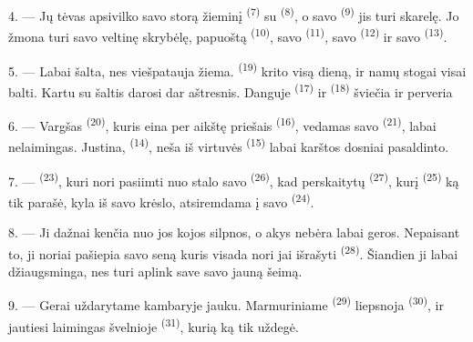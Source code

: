 4. --- Jų tėvas apsivilko savo storą žieminį  \textsuperscript{(7)} su
 \textsuperscript{(8)}, o savo 
\textsuperscript{(9)} jis turi skarelę. Jo žmona turi savo veltinę skrybėlę,
papuoštą  \textsuperscript{(10)}, savo 
\textsuperscript{(11)}, savo  \textsuperscript{(12)} ir savo
 \textsuperscript{(13)}.

5. --- Labai šalta, nes viešpatauja žiema.  \textsuperscript{(19)}
krito visą dieną, ir namų stogai visai balti. Kartu su  šaltis
darosi dar aštresnis. Danguje  \textsuperscript{(17)} ir
 \textsuperscript{(18)} šviečia ir perveria 

\VUsaut{4.2mm}
\VUsaut{3.0mm}

6. --- Vargšas  \textsuperscript{(20)}, kuris eina per aikštę
priešais  \textsuperscript{(16)}, vedamas savo 
\textsuperscript{(21)}, labai nelaimingas. Justina, 
\textsuperscript{(14)}, neša iš virtuvės  \textsuperscript{(15)}
labai karštos  dosniai pasaldinto.

7. ---  \textsuperscript{(23)}, kuri nori pasiimti nuo stalo savo
 \textsuperscript{(26)}, kad perskaitytų 
\textsuperscript{(27)}, kurį  \textsuperscript{(25)} ką tik
parašė, kyla iš savo krėslo, atsiremdama į savo 
\textsuperscript{(24)}.

8. --- Ji dažnai kenčia nuo 
jos kojos silpnos, o akys nebėra labai geros. Nepaisant to, ji noriai pašiepia savo
seną  kuris visada nori jai išrašyti 
\textsuperscript{(28)}. Šiandien ji labai džiaugsminga, nes turi aplink save savo
jauną šeimą.

9. --- Gerai uždarytame kambaryje jauku. Marmuriniame  \textsuperscript{(29)}
liepsnoja  \textsuperscript{(30)}, ir jautiesi laimingas švelnioje
  \textsuperscript{(31)}, kurią ką tik uždegė.

\VUsaut{4.2mm}
\VUsaut{3.0mm}

